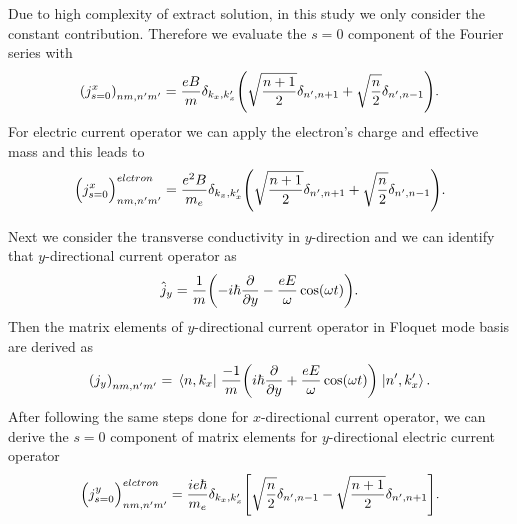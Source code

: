 Due to high complexity of extract solution, in this study we only consider the constant contribution. Therefore we evaluate the $s=0$ component of the Fourier series with
\begin{equation} \label{eq_d10}
    \qty({j}^x_{s=0})_{nm,n'm'} =
    \frac{eB}{{m}}
    \delta_{k_x,k'_x}
    \qty(\sqrt{\frac{n+1}{2}} \delta_{n',n+1} + \sqrt{\frac{n}{2}}
    \delta_{n',n-1}).
\end{equation}
For electric current operator we can apply the electron's charge and effective mass and this leads to
\begin{equation} \label{eq_d11}
    \Big({j}^x_{s=0}\Big)_{nm,n'm'}^{elctron} =
    \frac{e^2B}{{m_e}}
    \delta_{k_x,k'_x}
    \qty(\sqrt{\frac{n+1}{2}} \delta_{n',n+1} + \sqrt{\frac{n}{2}}
    \delta_{n',n-1}).
\end{equation}

Next we consider the transverse conductivity in $y$-direction and we can identify that $y$-directional current operator as
\begin{equation} \label{eq_d12}
  \hat{j}_y = \frac{1}{m} \qty(-i\hbar\pdv{y} - \frac{eE}{\omega}\cos(\omega t)).
\end{equation}
Then the matrix elements of $y$-directional current operator in Floquet mode basis are derived as
\begin{equation} \label{eq_d13}
  \qty({j}_y)_{nm,n'm'} =
  \mel{n,k_x}{\;\frac{-1}{m} \qty(i\hbar\pdv{y} + \frac{eE}{\omega}\cos(\omega t))\;}{n',k'_x}.
\end{equation}
After following the same steps done for $x$-directional current operator, we can derive the $s=0$ component of matrix elements for $y$-directional electric current operator
\begin{equation} \label{eq_d14}
    \Big({j}^y_{s=0}\Big)_{nm,n'm'}^{elctron} =
    \frac{ie\hbar}{{m_e}}
    \delta_{k_x,k'_x}
    \qty[
    \sqrt{\frac{n}{2}} \delta_{n',n-1}
    - \sqrt{\frac{n+1}{2}} \delta_{n',n+1}
    ].
\end{equation}

